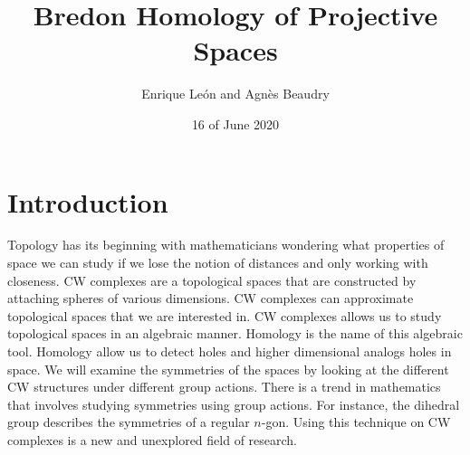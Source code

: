 \documentclass[12pt]{article}
\begin{document}
\title{Bredon Homology of Projective Spaces}
\author{Enrique Le\'{o}n and Agn\`{e}s Beaudry}
\date{16 of June 2020}
\maketitle
\section{Introduction}
    
    
    
    

Topology has its beginning with mathematicians wondering what properties of space we can study if we lose the notion of distances and only working with closeness. CW complexes are a topological spaces that are constructed by attaching spheres of various dimensions. CW complexes can approximate topological spaces that we are interested in. CW complexes allows us to study topological spaces in an algebraic manner. Homology is the name of this algebraic tool. Homology allow us to detect holes and higher dimensional analogs holes in space.\newline
We will examine the symmetries of the spaces by looking at the different CW structures under different group actions. There is a trend in mathematics that involves studying symmetries using group actions. For instance, the dihedral group describes the symmetries of a regular $n$-gon. Using this technique on CW complexes is a new and unexplored field of research.
\end{document}
